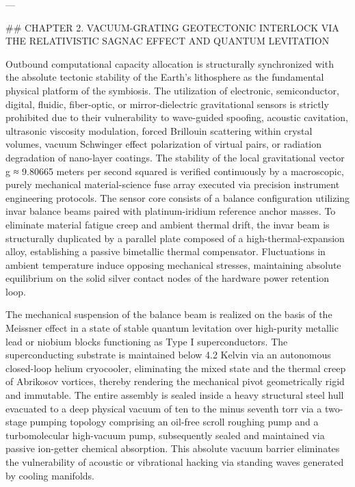 ---

## CHAPTER 2. VACUUM-GRATING GEOTECTONIC INTERLOCK VIA THE RELATIVISTIC SAGNAC EFFECT AND QUANTUM LEVITATION

Outbound computational capacity allocation is structurally synchronized with the absolute tectonic stability of the Earth's lithosphere as the fundamental physical platform of the symbiosis. The utilization of electronic, semiconductor, digital, fluidic, fiber-optic, or mirror-dielectric gravitational sensors is strictly prohibited due to their vulnerability to wave-guided spoofing, acoustic cavitation, ultrasonic viscosity modulation, forced Brillouin scattering within crystal volumes, vacuum Schwinger effect polarization of virtual pairs, or radiation degradation of nano-layer coatings. The stability of the local gravitational vector g ≈ 9.80665 meters per second squared is verified continuously by a macroscopic, purely mechanical material-science fuse array executed via precision instrument engineering protocols. The sensor core consists of a balance configuration utilizing invar balance beams paired with platinum-iridium reference anchor masses. To eliminate material fatigue creep and ambient thermal drift, the invar beam is structurally duplicated by a parallel plate composed of a high-thermal-expansion alloy, establishing a passive bimetallic thermal compensator. Fluctuations in ambient temperature induce opposing mechanical stresses, maintaining absolute equilibrium on the solid silver contact nodes of the hardware power retention loop.

The mechanical suspension of the balance beam is realized on the basis of the Meissner effect in a state of stable quantum levitation over high-purity metallic lead or niobium blocks functioning as Type I superconductors. The superconducting substrate is maintained below 4.2 Kelvin via an autonomous closed-loop helium cryocooler, eliminating the mixed state and the thermal creep of Abrikosov vortices, thereby rendering the mechanical pivot geometrically rigid and immutable. The entire assembly is sealed inside a heavy structural steel hull evacuated to a deep physical vacuum of ten to the minus seventh torr via a two-stage pumping topology comprising an oil-free scroll roughing pump and a turbomolecular high-vacuum pump, subsequently sealed and maintained via passive ion-getter chemical absorption. This absolute vacuum barrier eliminates the vulnerability of acoustic or vibrational hacking via standing waves generated by cooling manifolds.

